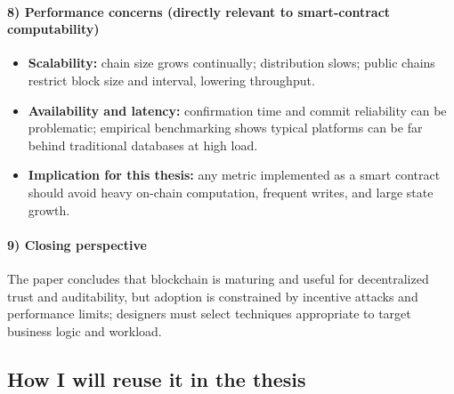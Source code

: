 \documentclass[11pt,a4paper]{article}
\begin{document}
\paragraph{8) Performance concerns (directly relevant to smart-contract computability)}
\begin{itemize}[leftmargin=*]
  \item \textbf{Scalability:} chain size grows continually; distribution slows; public chains restrict block size and interval, lowering throughput.
  \item \textbf{Availability and latency:} confirmation time and commit reliability can be problematic; empirical benchmarking shows typical platforms can be far behind traditional databases at high load.
  \item \textbf{Implication for this thesis:} any metric implemented as a smart contract should avoid heavy on-chain computation, frequent writes, and large state growth.
\end{itemize}

\paragraph{9) Closing perspective}
The paper concludes that blockchain is maturing and useful for decentralized trust and auditability, but adoption is constrained by incentive attacks and performance limits; designers must select techniques appropriate to target business logic and workload.

\subsection{How I will reuse it in the thesis}
\end{document}
